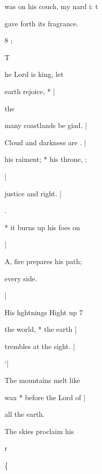 \documentclass{breviary}
\begin{document}
\begin{brevbody}
%
was on his couch, my nard i: t

gave forth its fragrance.

8 ;

\opening[rubric]{T}{he} Lord is king, let

earth rejoice, * |

the

many coastlands be giad. |

Cloud and darkness are . |

his raiment; * his throne, :

\begin{rubricpar}
|

\end{rubricpar}
justice and right. |

.

* it burns up his foes on

\begin{rubricpar}
|

\end{rubricpar}
A, fire prepares his path;

every side.

\begin{rubricpar}
\resp{} |

\end{rubricpar}
His hghtnings Hight up 7

the world, * the earth ]

trembles at the sight. |

\begin{rubricpar}
‘|

\end{rubricpar}
The mountains melt like

wax * before the Lord of |

all the earth.

The skies proclaim his

r

\begin{rubricpar}
\{

\end{rubricpar}
\end{brevbody}
\end{document}
